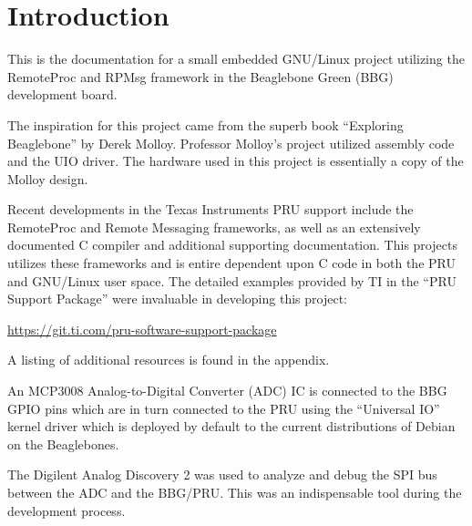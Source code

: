 \chapter{Introduction}

This is the documentation for a small embedded GNU/Linux project utilizing the RemoteProc and RPMsg framework in the Beaglebone Green (BBG) development board.

The inspiration for this project came from the superb book ``Exploring Beaglebone'' by Derek Molloy.  Professor Molloy's project utilized assembly code and the UIO driver.  The hardware used in this project is essentially a copy of the Molloy design.

Recent developments in the Texas Instruments PRU support include the RemoteProc and Remote Messaging frameworks, as well as an extensively documented C compiler and additional supporting documentation.  This projects utilizes these frameworks and is entire dependent upon C code in both the PRU and GNU/Linux user space.  The detailed examples provided by TI in the ``PRU Support Package'' were invaluable in developing this project:

\url{https://git.ti.com/pru-software-support-package}

A listing of additional resources is found in the appendix.

An MCP3008 Analog-to-Digital Converter (ADC) IC is connected to the BBG GPIO pins which are in turn connected to the PRU using the ``Universal IO'' kernel driver which is deployed by default to the current distributions of Debian on the Beaglebones.

The Digilent Analog Discovery 2 was used to analyze and debug the SPI bus between the ADC and the BBG/PRU.  This was an indispensable tool during the development process.
